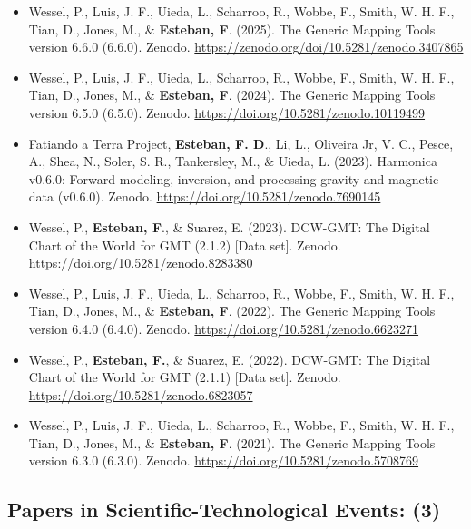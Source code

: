 \documentclass[11pt, a4paper]{article}
\begin{document}
\begin{itemize}
  \item Wessel, P., Luis, J. F., Uieda, L., Scharroo, R., Wobbe, F., Smith, W. H. F., Tian, D., Jones, M., \& \textbf{Esteban, F}. (2025). The Generic Mapping Tools version 6.6.0 (6.6.0). Zenodo. \url{https://zenodo.org/doi/10.5281/zenodo.3407865}
  \item Wessel, P., Luis, J. F., Uieda, L., Scharroo, R., Wobbe, F., Smith, W. H. F., Tian, D., Jones, M., \& \textbf{Esteban, F}. (2024). The Generic Mapping Tools version 6.5.0 (6.5.0). Zenodo. \url{https://doi.org/10.5281/zenodo.10119499}
  \item Fatiando a Terra Project, \textbf{Esteban, F. D}., Li, L., Oliveira Jr, V. C., Pesce, A., Shea, N., Soler, S. R., Tankersley, M., \& Uieda, L. (2023). Harmonica v0.6.0: Forward modeling, inversion, and processing gravity and magnetic data (v0.6.0). Zenodo. \url{https://doi.org/10.5281/zenodo.7690145}
  \item Wessel, P., \textbf{Esteban, F}., \& Suarez, E. (2023). DCW-GMT: The Digital Chart of the World for GMT (2.1.2) [Data set]. Zenodo. \url{https://doi.org/10.5281/zenodo.8283380}
  \item Wessel, P., Luis, J. F., Uieda, L., Scharroo, R., Wobbe, F., Smith, W. H. F., Tian, D., Jones, M., \& \textbf{Esteban, F}. (2022). The Generic Mapping Tools version 6.4.0 (6.4.0). Zenodo. \url{https://doi.org/10.5281/zenodo.6623271}
  \item Wessel, P., \textbf{Esteban, F.}, \& Suarez, E. (2022). DCW-GMT: The Digital Chart of the World for GMT (2.1.1) [Data set]. Zenodo. \url{https://doi.org/10.5281/zenodo.6823057}
  \item Wessel, P., Luis, J. F., Uieda, L., Scharroo, R., Wobbe, F., Smith, W. H. F., Tian, D., Jones, M., \& \textbf{Esteban, F}. (2021). The Generic Mapping Tools version 6.3.0 (6.3.0). Zenodo. \url{https://doi.org/10.5281/zenodo.5708769}
\end{itemize}

\subsection{Papers in Scientific-Technological Events: (3)}
\end{document}
